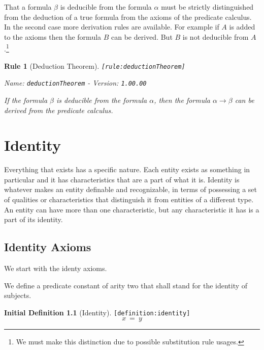 \documentclass[a4paper,german,10pt,twoside]{book}
\newtheorem{rul}{Rule}
\theoremstyle{definition}
\newtheorem{idefn}[defn]{Initial Definition}
\theoremstyle{remark}
\begin{document}
That a formula $\beta$ is deducible from the formula $\alpha$ must be strictly distinguished from the deduction of a true formula from the axioms of the predicate calculus. In the second case more derivation rules are available. For example if $A$ is added to the axioms then the formula $B$ can be derived. But $B$ is not deducible from $A$.\footnote{We must make this distinction due to possible substitution rule usages.}


\begin{rul}[Deduction Theorem]
\label{rule:deductionTheorem} \hypertarget{rule:deductionTheorem}{}
{\tt \tiny [\verb]rule:deductionTheorem]]}

\par
{\em   Name: \verb]deductionTheorem]  -  Version: \verb]1.00.00]}


If the formula $\beta$ is deducible from the formula $\alpha$, then the formula $\alpha \rightarrow \beta$ can be derived from the predicate calculus.
\end{rul}




\chapter{Identity} \label{chapter7} \hypertarget{chapter7}{}

Everything that exists has a specific nature. Each entity exists as something in particular and it has characteristics that are a part of what it is.
Identity is whatever makes an entity definable and recognizable, in terms of possessing a set of qualities or characteristics that distinguish it from entities of a different type. An entity can have more than one characteristic, but any characteristic it has is a part of its identity.

\section{Identity Axioms} \label{chapter7_section1} \hypertarget{chapter7_section1}{}
We start with the identy axioms.

\par
We define a predicate constant of arity two that shall stand for the identity of subjects.

\begin{idefn}[Identity]
\label{definition:identity} \hypertarget{definition:identity}{}
{\tt \tiny [\verb]definition:identity]]}
$$x \ = \ y
$$

\end{idefn}
\end{document}
